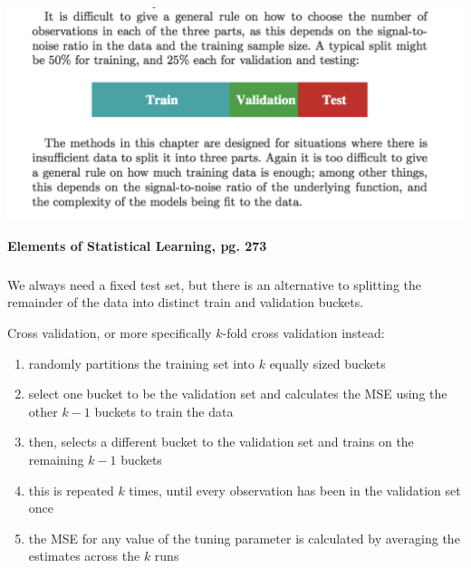 \documentclass[xetex,mathserif,serif,aspectratio=169]{beamer}
\begin{document}
\begin{frame}[fragile] \frametitle{} \oldB \small

\begin{center}
\includegraphics[width=\textwidth]{img/pg273.pdf}
\end{center}

{\small \textbf{Elements of Statistical Learning, pg. 273}}

\end{frame}

\begin{frame}[fragile] \frametitle{} \oldB \small


We always need a fixed test set, but there is an alternative
to splitting the remainder of the data into distinct train
and validation buckets.

\pause Cross validation, or more specifically $k$-fold cross validation
instead:
\begin{enumerate}
\item randomly partitions the training set into $k$ equally sized
buckets
\item select one bucket to be the validation set and calculates the
MSE using the other $k-1$ buckets to train the data
\item then, selects a different bucket to the validation set and trains
on the remaining $k-1$ buckets
\item this is repeated $k$ times, until every observation has been in the
validation set once
\item the MSE for any value of the tuning parameter is calculated by averaging
the estimates across the $k$ runs
\end{enumerate}

\end{frame}
\end{document}
